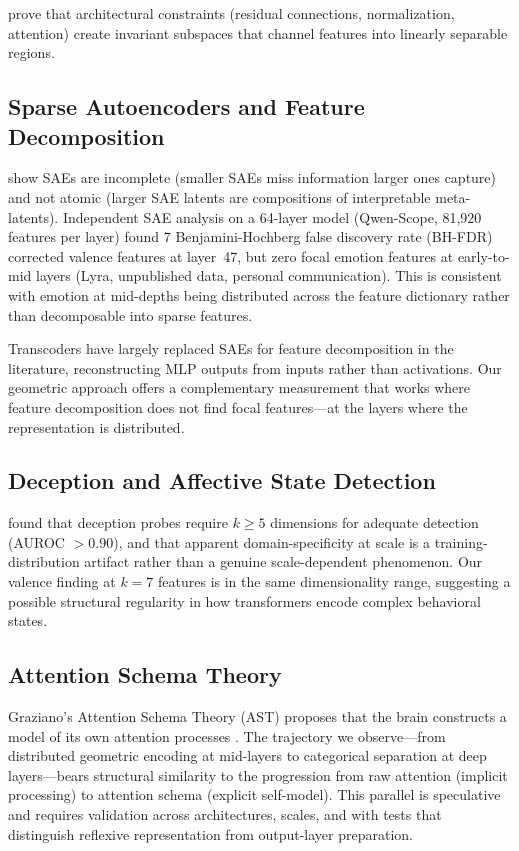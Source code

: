 \documentclass[11pt,a4paper]{article}
\begin{document}
\citet{saurez2026invariant} prove that architectural constraints
(residual connections, normalization, attention) create invariant
subspaces that channel features into linearly separable regions.

\subsection{Sparse Autoencoders and Feature Decomposition}

\citet{leask2025sparse} show SAEs are incomplete (smaller SAEs miss
information larger ones capture) and not atomic (larger SAE latents are
compositions of interpretable meta-latents). Independent SAE analysis on
a 64-layer model (Qwen-Scope, 81,920 features per layer) found 7
Benjamini-Hochberg false discovery rate (BH-FDR) corrected valence
features at layer~47, but zero focal emotion features at early-to-mid
layers (Lyra, unpublished data, personal communication). This is
consistent with emotion at mid-depths being distributed across the
feature dictionary rather than decomposable into sparse features.

Transcoders \citep{paulo2025transcoders} have largely replaced SAEs for
feature decomposition in the literature, reconstructing MLP outputs from
inputs rather than activations. Our geometric approach offers a
complementary measurement that works where feature decomposition does not
find focal features---at the layers where the representation is
distributed.

\subsection{Deception and Affective State Detection}

\citet{kumar2026deception} found that deception probes require $k \geq 5$
dimensions for adequate detection (AUROC ${>}0.90$), and that apparent
domain-specificity at scale is a training-distribution artifact rather
than a genuine scale-dependent phenomenon. Our valence finding at $k=7$
features is in the same dimensionality range, suggesting a possible
structural regularity in how transformers encode complex behavioral
states.

\subsection{Attention Schema Theory}

Graziano's Attention Schema Theory (AST) proposes that the brain
constructs a model of its own attention processes
\citep{graziano2013consciousness}. The trajectory we observe---from
distributed geometric encoding at mid-layers to categorical separation
at deep layers---bears structural similarity to the progression from raw
attention (implicit processing) to attention schema (explicit
self-model). This parallel is speculative and requires validation across
architectures, scales, and with tests that distinguish reflexive
representation from output-layer preparation.
\end{document}
